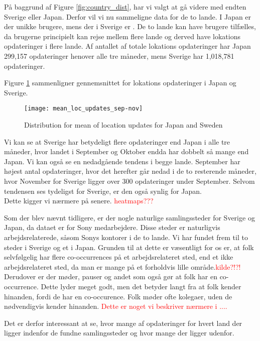 På baggrund af Figure \ref{fig:country_dist}, har vi valgt at gå videre med endten Sverige eller Japan. Derfor vil vi nu sammeligne data for de to lande. 
I Japan er der \numberUsersJapan{} unikke brugere, mens der i Sverige er \numberUsersSweden. De to lande kan have brugere tilfælles, da brugerne principielt kan rejse mellem flere lande og derved have lokations opdateringer i flere lande.  
Af antallet af totale lokations opdateringer har Japan 299,157 opdateringer henover alle tre måneder, mens Sverige har 1,018,781 opdateringer.

Figure \ref{fig:mean_loc_updates_sep-nov} sammenligner gennemsnittet for lokations opdateringer i Japan og Sverige.
\begin{figure}[H]
    \hspace*{-2.2cm}
    \centering
    \texttt{[image: mean\_loc\_updates\_sep-nov]}
    \caption{Distribution for mean of location updates for Japan and Sweden}
    \label{fig:mean_loc_updates_sep-nov}
\end{figure}

Vi kan se at Sverige har betydeligt flere opdateringer end Japan i alle tre måneder, hvor landet i September og Oktober endda har dobbelt så mange end Japan. Vi kan også se en nedadgående tendens i begge lande. September har højest antal opdateringer, hvor det herefter går nedad i de to resterende måneder, hvor November for Sverige ligger over 300 opdateringer under September. Selvom tendensen ses tydeligst for Sverige, er den også synlig for Japan. \\
Dette kigger vi nærmere på senere. \textcolor{red}{heatmaps???}

Som der blev nævnt tidligere, er der nogle naturlige samlingssteder for Sverige og Japan, da dataet er for Sony medarbejdere. Disse steder er naturligvis arbejdsrelaterede, såsom Sonys kontorer i de to lande. Vi har fundet frem til to steder i Sverige og et i Japan. Grunden til at dette er væsentligt for os er, at folk selvfølgelig har flere co-occurrences på et arbejdsrelateret sted, end et ikke arbejdsrelateret sted, da man er mange på et forholdvis lille område.\textcolor{red}{kilde?!?!} Derudover er der møder, pauser og andet som også gør at folk har en co-occurrence. Dette lyder meget godt, men det betyder langt fra at folk kender hinanden, fordi de har en co-occurence. Folk møder ofte kolegaer, uden de nødvendigvis kender hinanden. \textcolor{red}{Dette er noget vi beskriver nærmere i ....}

Det er derfor interessant at se, hvor mange af opdateringer for hvert land der ligger indenfor de fundne samlingssteder og hvor mange der ligger udenfor. 

